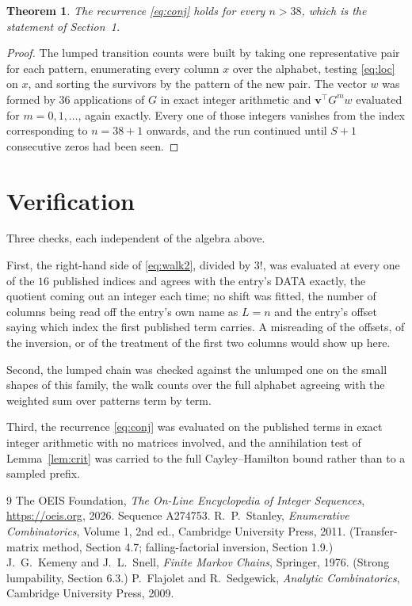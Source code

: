 \documentclass[11pt,a4paper]{article}
\theoremstyle{plain}
\newtheorem{theorem}{Theorem}
\theoremstyle{definition}
\begin{document}
\begin{theorem}
The recurrence \eqref{eq:conj} holds for every $n>38$, which is the statement of
Section~1.
\end{theorem}

\begin{proof}
The lumped transition counts were built by taking one representative pair for each pattern,
enumerating every column $x$ over the alphabet, testing \eqref{eq:loc} on $x$, and sorting
the survivors by the pattern of the new pair. The vector $w$ was formed by $36$
applications of $G$ in exact integer arithmetic and $\mathbf{v}^{\!\top}G^{m}w$
evaluated for $m=0,1,\dots$, again exactly. Every one of those integers vanishes from the
index corresponding to $n=38+1$ onwards, and the run continued until $S+1$ consecutive
zeros had been seen.
\end{proof}

\section{Verification}

Three checks, each independent of the algebra above.

First, the right-hand side of \eqref{eq:walk2}, divided by $3!$, was evaluated at every
one of the $16$ published indices and agrees with the entry's DATA exactly, the quotient
coming out an integer each time; no shift was fitted, the number of columns being read off the
entry's own name as $L=n$ and the entry's offset saying which index the first published
term carries. A misreading of the offsets, of the inversion, or of the treatment of the first
two columns would show up here.

Second, the lumped chain was checked against the unlumped one on the small shapes of this
family, the walk counts over the full alphabet agreeing with the weighted sum over patterns
term by term.

Third, the recurrence \eqref{eq:conj} was evaluated on the published terms in exact integer
arithmetic with no matrices involved, and the annihilation test of Lemma~\ref{lem:crit} was
carried to the full Cayley--Hamilton bound rather than to a sampled prefix.

\begin{thebibliography}{9}
 The OEIS Foundation, \emph{The On-Line Encyclopedia of Integer
Sequences}, \url{https://oeis.org}, 2026. Sequence A274753.
 R.~P.~Stanley, \emph{Enumerative Combinatorics}, Volume 1, 2nd ed.,
Cambridge University Press, 2011. (Transfer-matrix method, Section 4.7; falling-factorial
inversion, Section 1.9.)
 J.~G.~Kemeny and J.~L.~Snell, \emph{Finite Markov Chains}, Springer,
1976. (Strong lumpability, Section 6.3.)
 P.~Flajolet and R.~Sedgewick, \emph{Analytic Combinatorics}, Cambridge
University Press, 2009.
\end{thebibliography}
\end{document}

